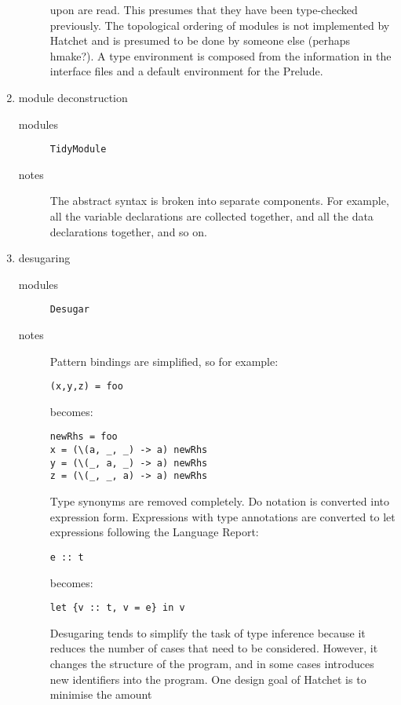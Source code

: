 \documentclass{article}
\begin{document}
\begin{enumerate}
\begin{description}
                  upon are read. This presumes that they have been type-checked
                  previously. The topological ordering of modules is not
                  implemented by Hatchet and is presumed to be done
                  by someone else (perhaps hmake?). A type environment
                  is composed from the information in the interface files
                  and a default environment for the Prelude.
     \end{description}
\item module deconstruction 
     \begin{description}
     \item[modules] \texttt{TidyModule}
     \item[notes] The abstract syntax is broken into separate components.
                  For example, all the variable declarations are collected
                  together, and all the data declarations together, and 
                  so on. 
     \end{description}
\item desugaring 
     \begin{description}
     \item[modules] \texttt{Desugar}
     \item[notes] Pattern bindings are simplified, so for example:
\begin{verbatim}
(x,y,z) = foo
\end{verbatim}
                  becomes:
\begin{verbatim}
newRhs = foo
x = (\(a, _, _) -> a) newRhs
y = (\(_, a, _) -> a) newRhs
z = (\(_, _, a) -> a) newRhs
\end{verbatim}
                 Type synonyms are removed completely. Do notation is
                 converted into expression form. 
                 Expressions with type annotations are converted to
                 let expressions following the Language Report:
\begin{verbatim}
e :: t
\end{verbatim}
                  becomes:
\begin{verbatim}
let {v :: t, v = e} in v
\end{verbatim}
                 Desugaring tends to
                 simplify the task of type inference because it reduces
                 the number of cases that need to be considered. However,
                 it changes the structure of the program, and in some 
                 cases introduces new identifiers into the program. 
                 One design goal of Hatchet is to minimise the amount

\end{description}
\end{enumerate}
\end{document}
